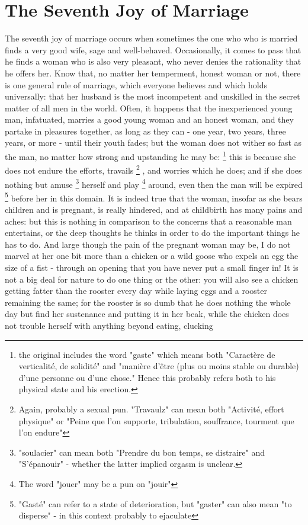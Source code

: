\documentclass{book}
\begin{document}
\chapter{The Seventh Joy of Marriage}
The seventh joy of marriage occurs when sometimes the one who who is married finds a very good wife, sage and well-behaved. Occasionally, it comes to pass that he finds a woman who is also very pleasant, who never denies the rationality that he offers her. Know that, no matter her temperment, honest woman or not, there is one general rule of marriage, which everyone believes and which holds universally: that her husband is the most incompetent and unskilled in the secret matter of all men in the world. Often, it happens that the inexperienced young man, infatuated, marries a good young woman and an honest woman, and they partake in pleasures together, as long as they can - one year, two years, three years, or more - until their youth fades; but the woman does not wither so fast as the man, no matter how strong and upstanding he may be:
\footnote{the original includes the word "gaste" which means both "Caractère de verticalité, de solidité" and "manière d'être (plus ou moins stable ou durable) d'une personne ou d'une chose." Hence this probably refers both to his physical state and his erection.}
this is because she does not endure the efforts, travails
\footnote{Again, probably a sexual pun. "Travaulz" can mean both "Activité, effort physique" or "Peine que l'on supporte, tribulation, souffrance, tourment que l'on endure"} 
, and worries which he does; and if she does nothing but amuse
\footnote{"soulacier" can mean both "Prendre du bon temps, se distraire" and "S'épanouir" - whether the latter implied orgasm is unclear.}
herself and play
\footnote{The word "jouer" may be a pun on "jouir"}
around, even then the man will be expired
\footnote{"Gasté" can refer to a state of deterioration, but "gaster" can also mean "to disperse" - in this context probably to ejaculate}
before her in this domain. It is indeed true that the woman, insofar as she bears children and is pregnant, is really hindered, and at childbirth has many pains and aches: but this is nothing in comparison to the concerns that a reasonable man entertains, or the deep thoughts he thinks in order to do the important things he has to do. And large though the pain of the pregnant woman may be, I do not marvel at her one bit more than a chicken or a wild goose who expels an egg the size of a fist - through an opening that you have never put a small finger in! It is not a big deal for nature to do one thing or the other: you will also see a chicken getting fatter than the rooster every day while laying eggs and a rooster remaining the same; for the rooster is so dumb that he does nothing the whole day but find her sustenance and putting it in her beak, while the chicken does not trouble herself with anything beyond eating, clucking 
\end{document}
